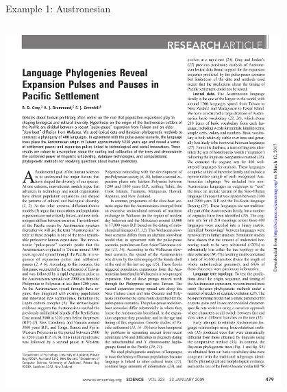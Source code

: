 \documentclass[9pt]{beamer}
\begin{document}
\begin{frame}{Example 1: Austronesian}
\begin{columns}
\begin{column}{0.5\textwidth}
      \includegraphics[width=0.8\textwidth,page=3,trim={1cm 1cm 7.5cm 16cm},clip]{austronesian.pdf}
    \end{column}
  \end{columns}
\end{frame}
\end{document}
